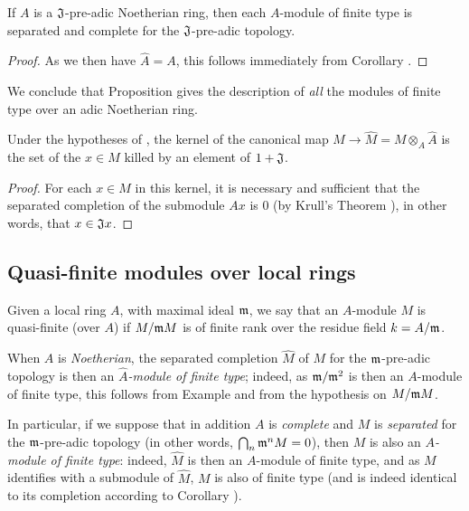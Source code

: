 \begin{cor}[7.3.6]
\label{0.7.3.6}
If $A$ is a $\mathfrak{J}$-pre-adic Noetherian ring, then each $A$-module of finite type
is separated and complete for the $\mathfrak{J}$-pre-adic topology.
\end{cor}

\begin{proof}
\label{proof-0.7.3.6}
As we then have $\widehat{A}=A$, this follows immediately from
Corollary .
\end{proof}

We conclude that Proposition  gives the description of
{\em all} the modules of finite type over an adic Noetherian ring.

\begin{cor}[7.3.7]
\label{0.7.3.7}
Under the hypotheses of , the kernel of the canonical map
$M\to\widehat{M}=M\otimes_A\widehat{A}$ is the set of the $x\in M$ killed by an element of
$1+\mathfrak{J}$.
\end{cor}

\begin{proof}
\label{proof-0.7.3.7}
For each $x\in M$ in this kernel, it is necessary and sufficient that the separated
completion of the submodule $Ax$ is $0$
(by Krull's Theorem ), in other words, that
$x\in\mathfrak{J}x$.
\end{proof}

\subsection{Quasi-finite modules over local rings}
\label{subsection-quasi-finite-modules-over-local-rings}

\begin{defn}[7.4.1]
\label{0.7.4.1}
Given a local ring $A$, with maximal ideal $\mathfrak{m}$, we say that an $A$-module $M$
is quasi-finite (over $A$) if $M/\mathfrak{m}M$ is of finite rank over the residue field
$k=A/\mathfrak{m}$.
\end{defn}

When $A$ is {\em Noetherian}, the separated completion $\widehat{M}$ of $M$ for the
$\mathfrak{m}$-pre-adic topology is then an {\em $\widehat{A}$-module of finite type};
indeed, as $\mathfrak{m}/\mathfrak{m}^2$ is then an $A$-module of finite type, this follows
from Example  and from the hypothesis on $M/\mathfrak{m}M$.

In particular, if we suppose that in addition $A$ is {\em complete} and $M$ is
{\em separated} for the $\mathfrak{m}$-pre-adic topology (in other words,
$\bigcap_n\mathfrak{m}^n M=0$), then $M$ is also an {\em $A$-module of finite type}: indeed,
$\widehat{M}$ is then an $A$-module of finite type, and as $M$ identifies with a submodule of
$\widehat{M}$, $M$ is also of finite type (and is indeed identical to its completion
according to Corollary ).

